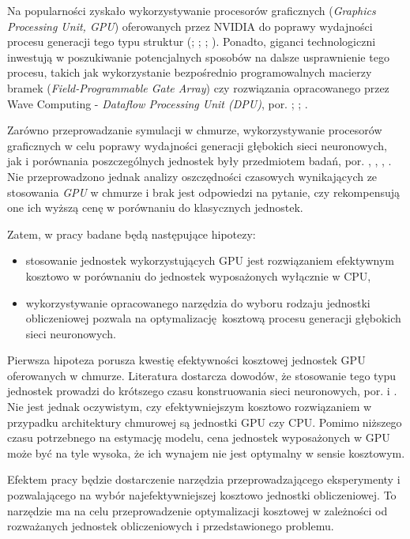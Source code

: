 \documentclass[12pt,a4paper,twoside]{article}
\begin{document}
Na popularności zyskało wykorzystywanie procesorów graficznych (\textit{Graphics Processing Unit, GPU}) oferowanych przez NVIDIA do poprawy wydajności procesu generacji tego typu struktur (\citet{jermain2015}; \citet{litvinenko2014}; \citet{strom2015}; \citet{vanhoucke2011}). Ponadto, giganci technologiczni inwestują w poszukiwanie potencjalnych sposobów na dalsze usprawnienie tego procesu, takich jak wykorzystanie bezpośrednio programowalnych macierzy bramek (\textit{Field-Programmable Gate Array}) czy rozwiązania opracowanego przez Wave Computing - \textit{Dataflow Processing Unit (DPU)}, por. \citet{gysel2016}; \citet{chen2016}; \citet{han2016}.

Zarówno przeprowadzanie symulacji w chmurze, wykorzystywanie procesorów graficznych w celu poprawy wydajności generacji głębokich sieci neuronowych, jak i porównania poszczególnych jednostek były przedmiotem badań, por. \citet{calheiros2010}, \citet{github2017}, \citet{medium2017b}, \citet{hackernoon2017}. Nie przeprowadzono jednak analizy oszczędności czasowych wynikających ze stosowania \textit{GPU} w chmurze i brak jest odpowiedzi na pytanie, czy rekompensują one ich wyższą cenę w porównaniu do klasycznych jednostek.

Zatem, w pracy badane będą następujące hipotezy:
\begin{itemize}
\item stosowanie jednostek wykorzystujących GPU jest rozwiązaniem efektywnym kosztowo  w porównaniu do jednostek wyposażonych wyłącznie w CPU,
\item wykorzystywanie opracowanego narzędzia do wyboru rodzaju jednostki obliczeniowej pozwala na optymalizację kosztową procesu generacji głębokich sieci neuronowych.
\end{itemize}

Pierwsza hipoteza porusza kwestię efektywności kosztowej jednostek GPU oferowanych w chmurze. Literatura dostarcza dowodów, że stosowanie tego typu jednostek prowadzi do krótszego czasu konstruowania sieci neuronowych, por. \citet{jermain2015} i \citet{litvinenko2014}. Nie jest jednak oczywistym, czy efektywniejszym kosztowo rozwiązaniem w przypadku architektury chmurowej są jednostki GPU czy CPU. Pomimo niższego czasu potrzebnego na estymację modelu, cena jednostek wyposażonych w GPU może być na tyle wysoka, że ich wynajem nie jest optymalny w sensie kosztowym.

Efektem pracy będzie dostarczenie narzędzia przeprowadzającego eksperymenty i pozwalającego na wybór najefektywniejszej kosztowo jednostki obliczeniowej. To narzędzie ma na
celu przeprowadzenie optymalizacji kosztowej w zależności od rozważanych jednostek obliczeniowych i przedstawionego problemu.
\end{document}
